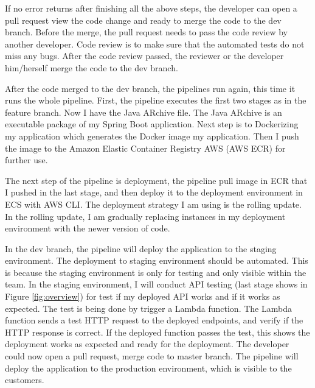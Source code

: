 If no error returns after finishing all the above steps, the developer can open a pull request view the code change and ready to merge the code to the dev branch. Before the merge, the pull request needs to pass the code review by another developer. Code review is to make sure that the automated tests do not miss any bugs. After the code review passed, the reviewer or the developer him/herself merge the code to the dev branch.  
\par
After the code merged to the dev branch, the pipelines run again, this time it runs the whole pipeline. First, the pipeline executes the first two stages as in the feature branch. Now I have the Java ARchive file. The Java ARchive is an executable package of my Spring Boot application. Next step is to Dockerizing my application which generates the Docker image my application. Then I push the image to the Amazon Elastic Container Registry AWS (AWS ECR) for further use.
\par
\label{deploy}
The next step of the pipeline is deployment, the pipeline pull image in ECR that I pushed in the last stage, and then deploy it to the deployment environment in ECS with AWS CLI. The deployment strategy I am using is the rolling update. In the rolling update, I am gradually replacing instances in my deployment environment with the newer version of code.
\par
In the dev branch, the pipeline will deploy the application to the staging environment. The deployment to staging environment should be automated. This is because the staging environment is only for testing and only visible within the team. 
In the staging environment, I will conduct API testing (last stage shows in Figure \ref{fig:overview}) for test if my deployed API works and if it works as expected. The test is being done by trigger a Lambda function. The Lambda function sends a test HTTP request to the deployed endpoints, and verify if the HTTP response is correct. If the deployed function passes the test, this shows the deployment works as expected and ready for the deployment. The developer could now open a pull request, merge code to master branch. The pipeline will deploy the application to the production environment, which is visible to the customers.
